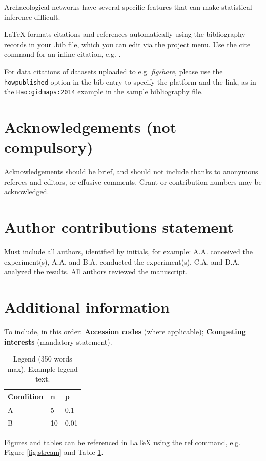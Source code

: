 \documentclass[fleqn,10pt]{wlscirep}
\begin{document}
Archaeological networks have several specific features that can make statistical inference difficult.





\noindent LaTeX formats citations and references automatically using the bibliography records in your .bib file, which you can edit via the project menu. Use the cite command for an inline citation, e.g.  \cite{Hao:gidmaps:2014}.

For data citations of datasets uploaded to e.g. \emph{figshare}, please use the \verb|howpublished| option in the bib entry to specify the platform and the link, as in the \verb|Hao:gidmaps:2014| example in the sample bibliography file.

\section*{Acknowledgements (not compulsory)}

Acknowledgements should be brief, and should not include thanks to anonymous referees and editors, or effusive comments. Grant or contribution numbers may be acknowledged.

\section*{Author contributions statement}

Must include all authors, identified by initials, for example:
A.A. conceived the experiment(s),  A.A. and B.A. conducted the experiment(s), C.A. and D.A. analyzed the results.  All authors reviewed the manuscript. 

\section*{Additional information}

To include, in this order: \textbf{Accession codes} (where applicable); \textbf{Competing interests} (mandatory statement). 





\begin{table}[ht]
\centering
\begin{tabular}{|l|l|l|}
\hline
Condition & n & p \\
\hline
A & 5 & 0.1 \\
\hline
B & 10 & 0.01 \\
\hline
\end{tabular}
\caption{\label{tab:example}Legend (350 words max). Example legend text.}
\end{table}

Figures and tables can be referenced in LaTeX using the ref command, e.g. Figure \ref{fig:stream} and Table \ref{tab:example}.
\end{document}
